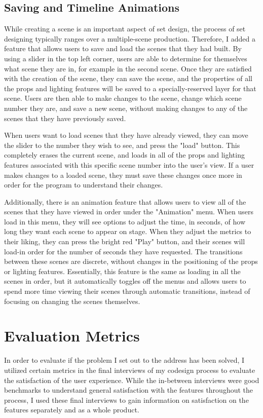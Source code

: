 \documentclass[10pt,twocolumn]{article}
\begin{document}
\subsection{Saving and Timeline Animations}
While creating a scene is an important aspect of set design, the process of set designing typically ranges over a multiple-scene production. Therefore, I added a feature that allows users to save and load the scenes that they had built. By using a slider in the top left corner, users are able to determine for themselves what scene they are in, for example in the second scene. Once they are satisfied with the creation of the scene, they can save the scene, and the properties of all the props and lighting features will be saved to a specially-reserved layer for that scene. Users are then able to make changes to the scene, change which scene number they are, and save a new scene, without making changes to any of the scenes that they have previously saved.

When users want to load scenes that they have already viewed, they can move the slider to the number they wish to see, and press the "load" button. This completely erases the current scene, and loads in all of the props and lighting features associated with this specific scene number into the user's view. If a user makes changes to a loaded scene, they must save these changes once more in order for the program to understand their changes. 

Additionally, there is an animation feature that allows users to view all of the scenes that they have viewed in order under the "Animation" menu. When users load in this menu, they will see options to adjust the time, in seconds, of how long they want each scene to appear on stage. When they adjust the metrics to their liking, they can press the bright red "Play" button, and their scenes will load-in order for the number of seconds they have requested. The transitions between these scenes are discrete, without changes in the positioning of the props or lighting features. Essentially, this feature is the same as loading in all the scenes in order, but it automatically toggles off the menus and allows users to spend more time viewing their scenes through automatic transitions, instead of focusing on changing the scenes themselves.  
\section{Evaluation Metrics}
In order to evaluate if the problem I set out to the address has been solved, I utilized certain metrics in the final interviews of my codesign process to evaluate the satisfaction of the user experience. While the in-between interviews were good benchmarks to understand general satisfaction with the features throughout the process, I used these final interviews to gain information on satisfaction on the features separately and as a whole product. 
\end{document}
